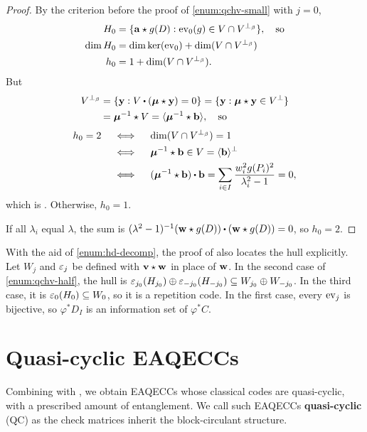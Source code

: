 \documentclass[twocolumn, 11pt]{scrartcl}
\begin{document}
\begin{proof}
    By the criterion before the proof of \ref{enum:qchv-small} with $j=0$,
    \begin{align*}
        H_0&=\{\mathbf{a}\star g(D):\operatorname{ev}_0(g)\in V\cap V^{\perp_\beta}\},\quad\text{so} \\
        \dim H_0&=\dim\ker(\operatorname{ev}_0)+\dim(V\cap V^{\perp_\beta}) \\
        h_0&=1+\dim(V\cap V^{\perp_\beta}).
    \end{align*}
    But
    \begin{align*}
        V^{\perp_\beta}&=\set{\bfy:V\dotpr(\bm\mu\star\bfy)=0}=\set{\bfy:\bm\mu\star\bfy\in V^\perp} \\
        &=\bm\mu^{-1}\star V=\ang{\bm\mu^{-1}\star\bfb},\quad\text{so}
    \end{align*}
    \begin{align*}
        h_0=2 &\qiff \dim(V\cap V^{\perp_\beta})=1 \\
        &\qiff \bm\mu^{-1}\star\bfb\in V=\ang\bfb^\perp \\
        &\qiff (\bm\mu^{-1}\star\bfb)\dotpr\bfb=\sum_{i\in I}\frac{w_i^2g(P_i)^2}{\lambda_i^2-1}=0,
    \end{align*}
    which is . Otherwise, $h_0=1$.
    
    If all $\lambda_i$ equal $\lambda$, the sum is $(\lambda^2-1)^{-1}(\bfw\star g(D))\dotpr(\bfw\star g(D))=0$, so $h_0=2$.
\end{proof}

\begin{remark}{}{}
    With the aid of \ref{enum:hd-decomp}, the proof of  also locates the hull explicitly. Let $W_j$ and $\varepsilon_j$ be defined with $\mathbf{v}\star\mathbf{w}$ in place of $\mathbf{w}$. In the second case of \ref{enum:qchv-half}, the hull is $\varepsilon_{j_0}(H_{j_0})\oplus\varepsilon_{-j_0}(H_{-j_0})\subseteq W_{j_0}\oplus W_{-j_0}$. In the third case, it is $\varepsilon_0(H_0)\subseteq W_0$, so it is a repetition code. In the first case, every $\operatorname{ev}_j$ is bijective, so $\varphi^*D_I$ is an information set of $\varphi^*C$.
\end{remark}

\section{Quasi-cyclic EAQECCs} \label{section:qc-eaqecc}

Combining  with , we obtain EAQECCs whose classical codes are quasi-cyclic, with a prescribed amount of entanglement. We call such EAQECCs \textbf{quasi-cyclic} (QC) as the check matrices inherit the block-circulant structure.
\end{document}
